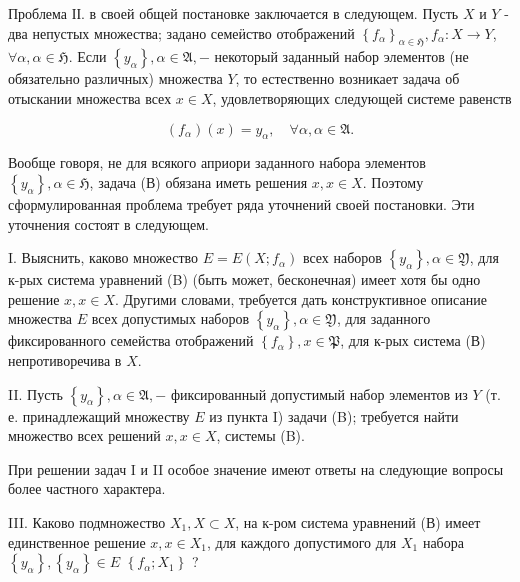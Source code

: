 \documentclass[10pt]{article}
\begin{document}
Проблема ІІ. в своей общей постановке заключается в следующем. Пусть $X$ и $Y$ - два непустых множества; задано семеӥство отображений $\left\{f_{\alpha}\right\}_{\alpha \in \mathfrak{H}}, f_{\alpha}: X \rightarrow Y$, $\forall \alpha, \alpha \in \mathfrak{H}$. Если $\left\{y_{\alpha}\right\}, \alpha \in \mathfrak{A},-$ некоторый заданный набор элементов (не обязательно различных) множества $Y$, то естественно возникает задача об отыскании множества всех $x \in X$, удовлетворяющих следующей системе равенств



\[

\left(f_{\alpha}\right)(x)=y_{\alpha}, \quad \forall \alpha, \alpha \in \mathfrak{A} .

\]



Вообще говоря, не для всякого априори заданного набора элементов $\left\{y_{\alpha}\right\}, \alpha \in \mathfrak{H}$, задача (В) обязана иметь решения $x, x \in X$. Поэтому сформулированная проблема требует ряда уточнений своей постановки. Эти уточнения состоят в следующем.



I. Выяснить, каково множество $E=E\left(X ; f_{\alpha}\right)$ всех наборов $\left\{y_{\alpha}\right\}, \alpha \in \mathfrak{Y}$, для к-рых система уравнений (B) (быть может, бесконечная) имеет хотя бы одно решение $x, x \in X$. Другими словами, требуется дать конструктивное описание множества $E$ всех допустимых наборов $\left\{y_{\alpha}\right\}, \alpha \in \mathfrak{Y}$, для заданного фиксированного семейства отображений $\left\{f_{\alpha}\right\}, x \in \mathfrak{P}$, для к-рых система (В) непротиворечива в $X$.



II. Пусть $\left\{y_{\alpha}\right\}, \alpha \in \mathfrak{A},-$ фиксированный допустимый набор элементов из $Y$ (т. е. принадлежащий множеству $E$ из пункта I) задачи (B); требуется найти множество всех решений $x, x \in X$, системы (B).



При решении задач I и II особое значение имеют ответы на следующие вопросы более частного характера.



III. Каково подмножество $X_{1}, X \subset X$, на к-ром система уравнений (В) имеет единственное решение $x, x \in X_{1}$, для каждого допустимого для $X_{1}$ набора $\left\{y_{\alpha}\right\},\left\{y_{\alpha}\right\} \in E$ $\left\{f_{\alpha} ; X_{1}\right\}$ ?
\end{document}

